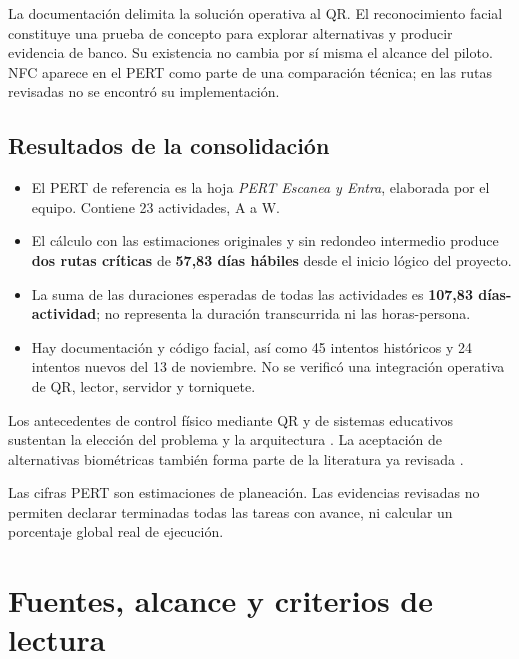 \documentclass[11pt,letterpaper]{article}
\newcommand{\pagina}[1]{\clearpage\section{#1}}
\begin{document}
La documentación delimita la solución operativa al QR. El reconocimiento facial constituye una prueba de concepto para explorar alternativas y producir evidencia de banco. Su existencia no cambia por sí misma el alcance del piloto. NFC aparece en el PERT como parte de una comparación técnica; en las rutas revisadas no se encontró su implementación.

\subsection{Resultados de la consolidación}
\begin{itemize}
\item El PERT de referencia es la hoja \textit{PERT Escanea y Entra}, elaborada por el equipo. Contiene 23 actividades, A a W.
\item El cálculo con las estimaciones originales y sin redondeo intermedio produce \textbf{dos rutas críticas} de \textbf{57,83 días hábiles} desde el inicio lógico del proyecto.
\item La suma de las duraciones esperadas de todas las actividades es \textbf{107,83 días-actividad}; no representa la duración transcurrida ni las horas-persona.
\item Hay documentación y código facial, así como 45 intentos históricos y 24 intentos nuevos del 13 de noviembre. No se verificó una integración operativa de QR, lector, servidor y torniquete.
\end{itemize}

Los antecedentes de control físico mediante QR y de sistemas educativos sustentan la elección del problema y la arquitectura \parencite{kao2011physical,cano2026sistema,alsawi2026qracs}. La aceptación de alternativas biométricas también forma parte de la literatura ya revisada \parencite{rukhiran2023user}.

Las cifras PERT son estimaciones de planeación. Las evidencias revisadas no permiten declarar terminadas todas las tareas con avance, ni calcular un porcentaje global real de ejecución.

\pagina{Fuentes, alcance y criterios de lectura}
\end{document}
